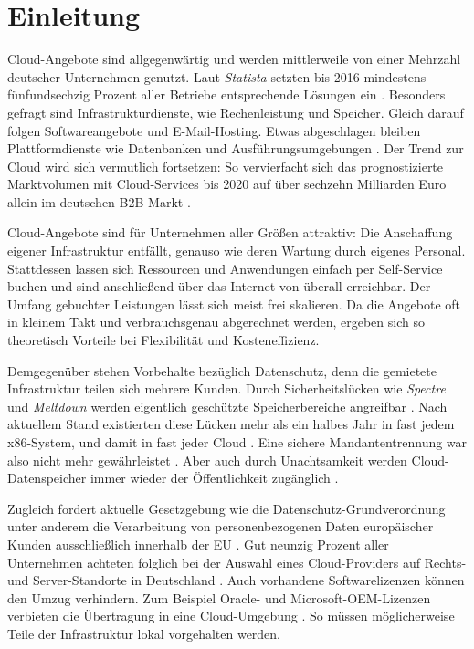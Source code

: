 \chapter{Einleitung}

Cloud-Angebote sind allgegenwärtig und werden mittlerweile von einer Mehrzahl deutscher Unternehmen genutzt. Laut \emph{Statista} setzten bis 2016 mindestens fünfundsechzig Prozent aller Betriebe entsprechende Lösungen ein \cite{bitkom:2017:cloud-nutzung-unternehmen}. Besonders gefragt sind Infrastrukturdienste, wie Rechenleistung und Speicher. Gleich darauf folgen Softwareangebote und E-Mail-Hosting. Etwas abgeschlagen bleiben Plattformdienste wie Datenbanken und Ausführungsumgebungen \cite{destatis:2016:cloud-nutzung-unternehmen-einsatzzweck}. Der Trend zur Cloud wird sich vermutlich fortsetzen: So vervierfacht sich das prognostizierte Marktvolumen mit Cloud-Services bis 2020 auf über sechzehn Milliarden Euro allein im deutschen B2B-Markt \cite{isg:2017:cloud-ausgaben-2020}.

Cloud-Angebote sind für Unternehmen aller Größen attraktiv: Die Anschaffung eigener Infrastruktur entfällt, genauso wie deren Wartung durch eigenes Personal. Stattdessen lassen sich Ressourcen und Anwendungen einfach per Self-Service buchen und sind anschließend über das Internet von überall erreichbar. Der Umfang gebuchter Leistungen lässt sich meist frei skalieren. Da die Angebote oft in kleinem Takt und verbrauchsgenau abgerechnet werden, ergeben sich so theoretisch Vorteile bei Flexibilität und Kosteneffizienz.

Demgegenüber stehen Vorbehalte bezüglich Datenschutz, denn die gemietete Infrastruktur teilen sich mehrere Kunden. Durch Sicherheitslücken wie \emph{Spectre} und \emph{Meltdown} werden eigentlich geschützte Speicherbereiche angreifbar \cite{Kocher2018spectre, Lipp2018meltdown}. Nach aktuellem Stand existierten diese Lücken mehr als ein halbes Jahr in fast jedem x86-System, und damit in fast jeder Cloud \cite{techcrunch:2018:spectre-meltdown-tier-2-cloud-vendors}. Eine sichere Mandantentrennung war also nicht mehr gewährleistet \cite{aws:2018:security-bulletin}. Aber auch durch Unachtsamkeit werden Cloud-Datenspeicher immer wieder der Öffentlichkeit zugänglich \cite{upguard:2017:breach-alteryx, upguard:2017:breach-centcom, kromtech:2018:breach-fedex}.

Zugleich fordert aktuelle Gesetzgebung wie die Datenschutz-Grundverordnung unter anderem die Verarbeitung von personenbezogenen Daten europäischer Kunden ausschließlich innerhalb der EU \cite{eu:2016:bdsvg}. Gut neunzig Prozent aller Unternehmen achteten folglich bei der Auswahl eines Cloud-Providers auf Rechts- und Server-Standorte in Deutschland \cite{gartner:2017:cloud-market}. Auch vorhandene Softwarelizenzen können den Umzug verhindern. Zum Beispiel Oracle- und Microsoft-OEM-Lizenzen verbieten die Übertragung in eine Cloud-Umgebung \cite{microsoft:2017:licensing, oracle:2018:licensing}. So müssen möglicherweise Teile der Infrastruktur lokal vorgehalten werden.

